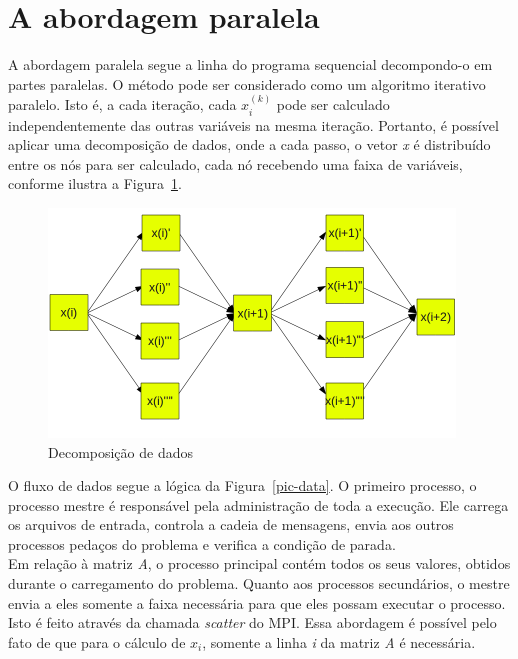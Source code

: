 \documentclass[a4paper]{article}
\begin{document}
\section{A abordagem paralela}
\indent \indent A abordagem paralela segue a linha do programa sequencial decompondo-o em partes paralelas. O método pode ser considerado como um algoritmo iterativo paralelo. Isto é, a cada iteração, cada \begin{math}x^{(k)}_i\end{math} pode ser calculado independentemente das outras variáveis na mesma iteração. Portanto, é possível aplicar uma decomposição de dados, onde a cada passo, o vetor \emph{x} é distribuído entre os nós para ser calculado, cada nó recebendo uma faixa de variáveis, conforme ilustra a Figura~\ref{pic-dec}.\\
\begin{figure}[float=p]
	\centerline{\includegraphics[width=408px, height=230px]{dec}}
	\caption{Decomposição de dados}
	\label{pic-dec}
\end{figure}
\indent O fluxo de dados segue a lógica da Figura~\ref{pic-data}. O primeiro processo, o processo mestre é responsável pela administração de toda a execução. Ele carrega os arquivos de entrada, controla a cadeia de mensagens, envia aos outros processos pedaços do problema e verifica a condição de parada.\\
\indent Em relação à matriz \emph{A}, o processo principal contém todos os seus valores, obtidos durante o carregamento do problema. Quanto aos processos secundários, o mestre envia a eles somente a faixa necessária para que eles possam executar o processo. Isto é feito através da chamada \emph{scatter} do MPI. Essa abordagem é possível pelo fato de que para o cálculo de \begin{math}x_i\end{math}, somente a linha \emph{i} da matriz \emph{A} é necessária.\\
\end{document}
